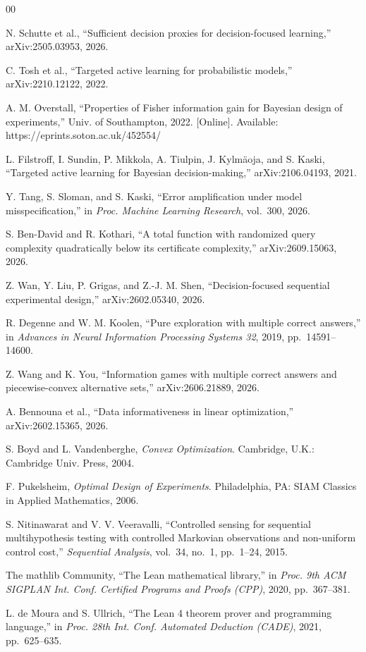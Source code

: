 \begin{thebibliography}{00}

 N. Schutte et al., ``Sufficient decision proxies for
decision-focused learning,'' arXiv:2505.03953, 2026.

 C. Tosh et al., ``Targeted active learning for probabilistic models,''
arXiv:2210.12122, 2022.


 A. M. Overstall, ``Properties of Fisher information gain for
Bayesian design of experiments,'' Univ. of Southampton, 2022. [Online]. Available:
https://eprints.soton.ac.uk/452554/

 L. Filstroff, I. Sundin, P. Mikkola, A. Tiulpin, J. Kylm\"{a}oja,
and S. Kaski, ``Targeted active learning for Bayesian decision-making,'' arXiv:2106.04193,
2021.

 Y. Tang, S. Sloman, and S. Kaski, ``Error amplification under model
misspecification,'' in \emph{Proc. Machine Learning Research}, vol.~300, 2026.

 S. Ben-David and R. Kothari, ``A total function with randomized
query complexity quadratically below its certificate complexity,'' arXiv:2609.15063, 2026.

 Z. Wan, Y. Liu, P. Grigas, and Z.-J. M. Shen, ``Decision-focused
sequential experimental design,'' arXiv:2602.05340, 2026.


 R. Degenne and W. M. Koolen, ``Pure exploration with multiple correct
answers,'' in \emph{Advances in Neural Information Processing Systems 32}, 2019,
pp.~14591--14600.

 Z. Wang and K. You, ``Information games with multiple correct answers
and piecewise-convex alternative sets,'' arXiv:2606.21889, 2026.

 A. Bennouna et al., ``Data informativeness in linear optimization,''
arXiv:2602.15365, 2026.

 S. Boyd and L. Vandenberghe, \emph{Convex Optimization}. Cambridge,
U.K.: Cambridge Univ. Press, 2004.

 F. Pukelsheim, \emph{Optimal Design of Experiments}. Philadelphia,
PA: SIAM Classics in Applied Mathematics, 2006.

 S. Nitinawarat and V. V. Veeravalli, ``Controlled sensing for
sequential multihypothesis testing with controlled Markovian observations and non-uniform
control cost,'' \emph{Sequential Analysis}, vol.~34, no.~1, pp.~1--24, 2015.

 The mathlib Community, ``The Lean mathematical library,'' in
\emph{Proc. 9th ACM SIGPLAN Int. Conf. Certified Programs and Proofs (CPP)}, 2020,
pp.~367--381.

 L. de Moura and S. Ullrich, ``The Lean 4 theorem prover and
programming language,'' in \emph{Proc. 28th Int. Conf. Automated Deduction (CADE)}, 2021,
pp.~625--635.

\end{thebibliography}


